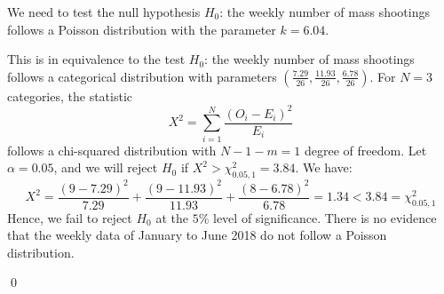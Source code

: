 \documentclass[english]{article}
\begin{document}
\par We need to test the null hypothesis
$H_0$: the weekly number of mass shootings follows a Poisson distribution with the parameter $k=6.04$. 
\par This is in equivalence to the test $H_0$: the weekly number of mass shootings follows a categorical distribution with parameters $(\frac{7.29}{26},\frac{11.93}{26},\frac{6.78}{26})$.
For $N=3$ categories, the statistic 
\begin{equation*}
X^2=\sum_{i=1}^{N}\frac{(O_i-E_i)^2}{E_i}
\end{equation*}
follows a chi-squared distribution with $N-1-m=1$ degree of freedom. Let $\alpha=0.05$, and we will reject $H_0$ if $X^2>\chi^2_{0.05,1}=3.84$. We have:
\begin{equation*}
X^2=\frac{(9-7.29)^2}{7.29}+\frac{(9-11.93)^2}{11.93}+\frac{(8-6.78)^2}{6.78}=1.34<3.84=\chi^2_{0.05,1}
\end{equation*}
Hence, we fail to reject $H_0$ at the $5\%$ level of significance. There is no evidence that the weekly data of January to June 2018 do not follow a Poisson distribution. 
\par \qed
\end{document}
